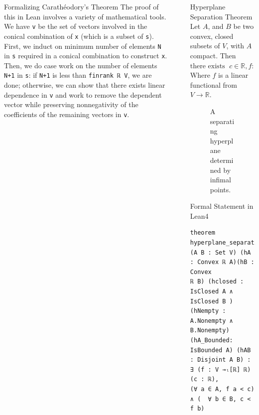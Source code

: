 \documentclass[final]{beamer}
\newlength{\sepwidth}
\newlength{\colwidth}
\newcommand{\separatorcolumn}{\begin{column}{\sepwidth}\end{column}}
\begin{document}
\begin{frame}[fragile]
\begin{columns}[t]
\begin{column}{\colwidth}
\begin{block}{Formalizing Carath\'eodory's Theorem}
              The proof of this in Lean involves a variety of mathematical tools. We have \verb|v| be the set of vectors involved in the conical combination of \verb|x| (which is a subset of \verb|s|). First, we induct on minimum number of elements \verb|N| in \verb|s| required in a conical combination to construct \verb|x|. Then, we do case work on the number of elements \verb|N+1| in \verb|s|: if \verb|N+1| is less than \verb|finrank ℝ V|, we are done; otherwise, we can show that there exists linear dependence in \verb|v| and work to remove the dependent vector while preserving nonnegativity of the coefficients of the remaining vectors in \verb|v|.  
            \end{block}    
            
            

        \end{column}

        \separatorcolumn

        \begin{column}{\colwidth}

            
          \begin{alertblock}{Hyperplane Separation Theorem}
            Let $A$, and $B$ be two convex, closed subsets of $V$, with $A$ compact. Then $
                \text{there exists } \; c\in \mathbb{R}, f : V\to \mathbb{R} \; \text{such that} \; f(a) < c \; \text{for all}\; a\in A, \ c < f(b)\; \text{for all}\; b\in B
              $ Where $f$ is a linear functional from $V\to \mathbb{R}$.
        \end{alertblock}

        \begin{figure}[htbp]
            \centering
            
            \caption{A separating hyperplane determined by infimal points. \label{fig:hyperplane-separation}}
        \end{figure}

\begin{block}{Formal Statement in Lean4}
\vspace{-0.5em}
\begin{Verbatim}
theorem hyperplane_separation  (A B : Set V) (hA : Convex ℝ A)(hB : Convex 
ℝ B) (hclosed : IsClosed A ∧ IsClosed B )(hNempty : A.Nonempty ∧ B.Nonempty) 
(hA_Bounded: IsBounded A) (hAB : Disjoint A B) : ∃ (f : V →ₗ[ℝ] ℝ) (c : ℝ),
(∀ a ∈ A, f a < c) ∧ (  ∀ b ∈ B, c < f b)
\end{Verbatim}
\end{block}


\end{column}
\end{columns}
\end{frame}
\end{document}
